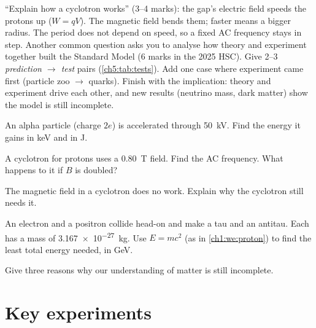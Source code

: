 \begin{examtip}
``Explain how a cyclotron works'' (3--4 marks): the gap's electric field speeds the
protons up ($W = qV$). The magnetic field bends them; faster means a bigger radius. The
period does not depend on speed, so a fixed AC frequency stays in step. Another common
question asks you to analyse how theory and experiment together built the Standard Model
(6 marks in the 2025 HSC). Give 2--3 \emph{prediction $\to$ test} pairs
(\cref{ch5:tab:tests}). Add one case where experiment came first (particle zoo $\to$
quarks). Finish with the implication: theory and experiment drive each other, and new
results (neutrino mass, dark matter) show the model is still incomplete.
\end{examtip}

\begin{quickcheck}
  \item An alpha particle (charge $2e$) is accelerated through \qty{50}{kV}. Find the energy
        it gains in \si{keV} and in \si{J}.
  \item A cyclotron for protons uses a \qty{0.80}{T} field. Find the AC frequency. What
        happens to it if $B$ is doubled?
  \item The magnetic field in a cyclotron does no work. Explain why the cyclotron still
        needs it.
  \item An electron and a positron collide head-on and make a tau and an antitau. Each has
        a mass of \qty{3.167e-27}{kg}. Use $E = mc^2$ (as in \cref{ch1:we:proton}) to
        find the least total energy needed, in \si{GeV}.
  \item Give three reasons why our understanding of matter is still incomplete.
\end{quickcheck}

\section{Key experiments}\label{ch5:sec:experiments}

